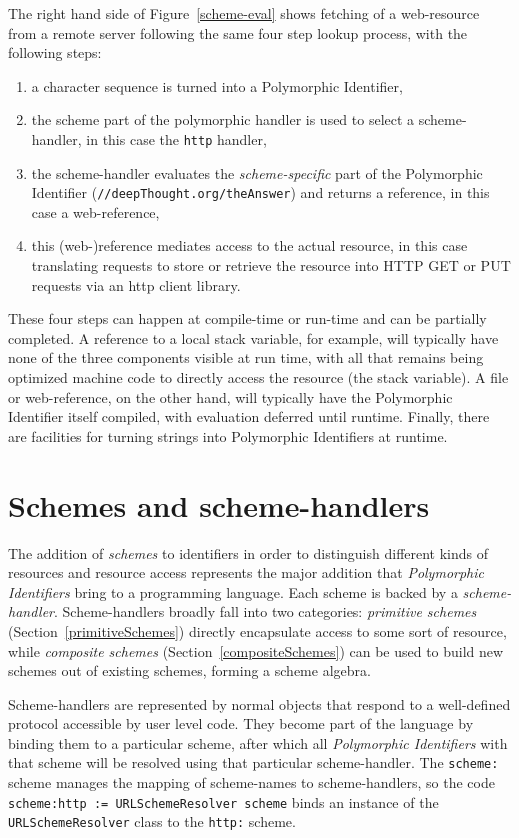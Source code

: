 \documentclass{acm_proc_article-sp}
\begin{document}
The right hand side of Figure~\ref{scheme-eval} shows fetching of a web-resource from
a remote server following the same four step lookup process, with the following steps:

\begin{enumerate}
\item a character sequence is turned into a Polymorphic Identifier,
\item the scheme part of the polymorphic handler is used to select a scheme-handler, in this case the {\tt http} handler,
\item the scheme-handler evaluates the \emph{scheme-specific} part of the Polymorphic Identifier ({\tt //deepThought.org/theAnswer})
	 and returns a reference, in this case a web-reference,
\item this (web-)reference mediates access to the actual resource, in this case translating requests to store or retrieve the 
	resource into HTTP GET or PUT requests via an http client library.
\end{enumerate}

These four steps can happen at compile-time or run-time and can be partially completed.
A reference to a local stack variable, for example, will typically have none of the
three components visible at run time, with all that remains being optimized 
machine code to directly access the resource (the stack variable).
A file or web-reference, on the other hand, will typically have the Polymorphic Identifier itself
compiled, with evaluation deferred until runtime.  Finally, there are facilities
for turning strings into Polymorphic Identifiers at runtime.


\section{Schemes and scheme-handlers}
\label{schemes}
The addition of \emph{schemes} to identifiers in order to distinguish different kinds of resources
and resource access represents
the major addition that \emph{Polymorphic Identifiers} bring to a programming language.
Each scheme is backed by a \emph{scheme-handler}.  Scheme-handlers broadly fall into two categories:
 \emph{primitive schemes} (Section~\ref{primitiveSchemes})
directly encapsulate access to some sort of resource, while \emph{composite schemes} (Section~\ref{compositeSchemes})
can be used to build new schemes out of existing schemes, forming a scheme algebra.

\sloppy   %

Scheme-handlers are represented by normal objects that respond to a well-defined protocol 
accessible by user level code.  They
become part of the language by binding them to a particular scheme, after which
all \emph{Polymorphic Identifiers} with that scheme will be resolved using that particular scheme-handler.
The {\tt scheme:} scheme manages the mapping of scheme-names to scheme-handlers, so the code 
{\tt scheme:http := URLSchemeResolver scheme} binds an instance of the {\tt URLSchemeResolver} class
to the {\tt http:} scheme.
\end{document}
